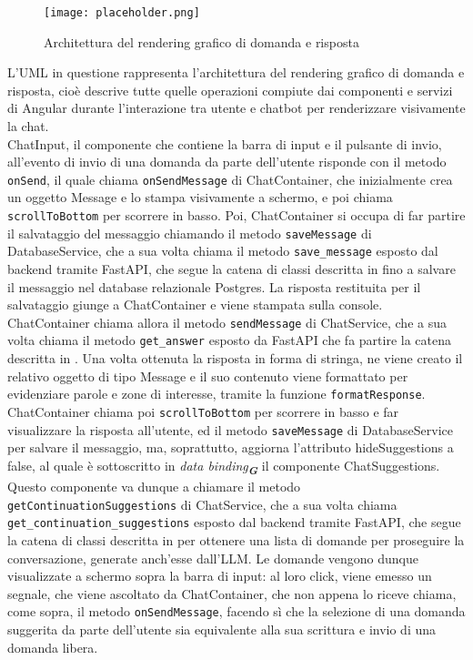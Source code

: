 \begin{figure}[h]
    \centering
    \texttt{[image: placeholder.png]}
    \caption{Architettura del rendering grafico di domanda e risposta}
\end{figure}

L'UML in questione rappresenta l'architettura del rendering grafico di domanda e risposta, cioè descrive tutte quelle operazioni compiute dai componenti e servizi di Angular durante l'interazione tra utente e chatbot per renderizzare visivamente la chat.\\
ChatInput, il componente che contiene la barra di input e il pulsante di invio, all'evento di invio di una domanda da parte dell'utente risponde con il metodo \texttt{onSend}, il quale chiama \texttt{onSendMessage} di ChatContainer, che inizialmente crea un oggetto Message e lo stampa visivamente a schermo, e poi chiama \texttt{scrollToBottom} per scorrere in basso. Poi, ChatContainer si occupa di far partire il salvataggio del messaggio chiamando il metodo \texttt{saveMessage} di DatabaseService, che a sua volta chiama il metodo \texttt{save\_message} esposto dal backend tramite FastAPI, che segue la catena di classi descritta in  fino a salvare il messaggio nel database relazionale Postgres. La risposta restituita per il salvataggio giunge a ChatContainer e viene stampata sulla console. ChatContainer chiama allora il metodo \texttt{sendMessage} di ChatService, che a sua volta chiama il metodo \texttt{get\_answer} esposto da FastAPI che fa partire la catena descritta in . Una volta ottenuta la risposta in forma di stringa, ne viene creato il relativo oggetto di tipo Message e il suo contenuto viene formattato per evidenziare parole e zone di interesse, tramite la funzione \texttt{formatResponse}. ChatContainer chiama poi \texttt{scrollToBottom} per scorrere in basso e far visualizzare la risposta all'utente, ed il metodo \texttt{saveMessage} di DatabaseService per salvare il messaggio, ma, soprattutto, aggiorna l'attributo hideSuggestions a false, al quale è sottoscritto in \emph{data binding}\textsubscript{\textbf{\textit{G}}} il componente ChatSuggestions. Questo componente va dunque a chiamare il metodo \texttt{getContinuationSuggestions} di ChatService, che a sua volta chiama \texttt{get\_continuation\_suggestions} esposto dal backend tramite FastAPI, che segue la catena di classi descritta in  per ottenere una lista di domande per proseguire la conversazione, generate anch'esse dall'LLM. Le domande vengono dunque visualizzate a schermo sopra la barra di input: al loro click, viene emesso un segnale, che viene ascoltato da ChatContainer, che non appena lo riceve chiama, come sopra, il metodo \texttt{onSendMessage}, facendo sì che la selezione di una domanda suggerita da parte dell'utente sia equivalente alla sua scrittura e invio di una domanda libera.

